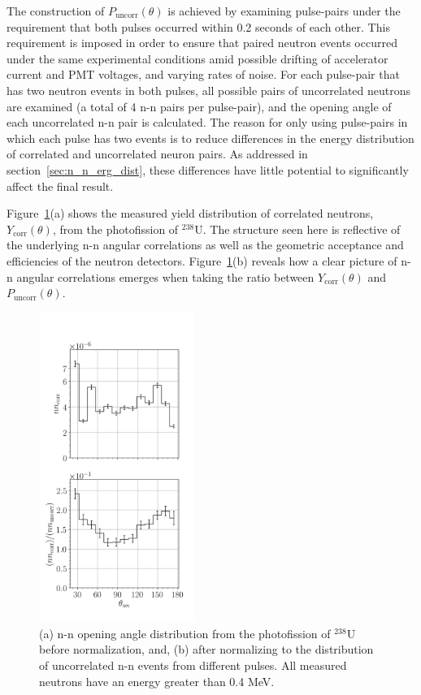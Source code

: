 \documentclass[%
 reprint,
 amsmath,amssymb,
 aps,
 nofootinbib
]{revtex4-1}
\begin{document}
The construction of $P_{\text{uncorr}}(\theta)$ is achieved by examining pulse-pairs under the requirement that both pulses occurred within 0.2 seconds of each other.
This requirement is imposed in order to ensure that paired neutron events occurred under the same experimental conditions amid possible drifting of accelerator current and PMT voltages, and varying rates of noise.
For each pulse-pair that has two neutron events in both pulses, all possible pairs of uncorrelated neutrons are examined (a total of 4 n-n pairs per pulse-pair), and the opening angle of each uncorrelated n-n pair is calculated.
The reason for only using pulse-pairs in which each pulse has two events is to reduce differences in the energy distribution of correlated and uncorrelated neuron pairs.
As addressed in section~\ref{sec:n_n_erg_dist}, these differences have little potential to significantly affect the final result.

Figure~\ref{fig:SPDPNormalization}(a) shows the measured yield distribution of correlated neutrons, $Y_{\text{corr}}(\theta)$, from the photofission of $^{238}$U.
The structure seen here is reflective of the underlying n-n angular correlations as well as the geometric acceptance and efficiencies of the neutron detectors.
Figure~\ref{fig:SPDPNormalization}(b) reveals how a clear picture of n-n angular correlations emerges when taking the ratio between $Y_{\text{corr}}(\theta)$ and $P_{\text{uncorr}}(\theta)$.
\begin{figure}[]
\centering
    \includegraphics[width=0.45\textwidth]{SPDPNormalization.png}
    \caption{(a) n-n opening angle distribution from the photofission of $^{238}$U before normalization, and, (b) after normalizing to the distribution of uncorrelated n-n events from different pulses.
    All measured neutrons have an energy greater than 0.4 MeV.}
    \label{fig:SPDPNormalization}
\end{figure}
\end{document}
